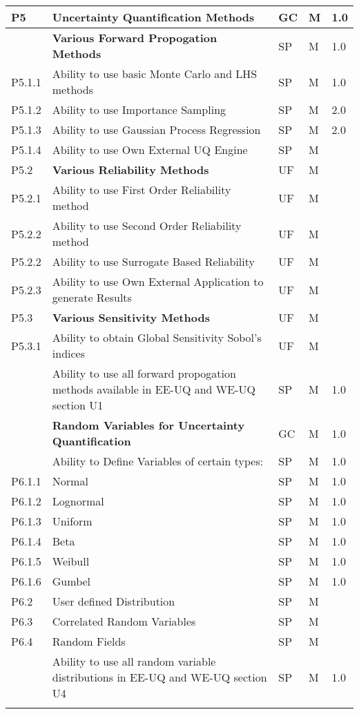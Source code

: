 \begin{longtable}{| p{} | p{} | p{} | p{} |  p{} |}
   P5 & \textbf{Uncertainty Quantification Methods} &  GC & M & 1.0  \\ \hline
   \softwareSwitch{PBE}{ 
  P5.1 & \textbf{Various Forward Propogation Methods} & SP & M & 1.0  \\ \hline
  P5.1.1 & Ability to use basic  Monte Carlo and LHS methods & SP & M & 1.0 \\ \hline
  P5.1.2 & Ability to use Importance Sampling  & SP & M & 2.0 \\ \hline
  P5.1.3 & Ability to use Gaussian Process Regression & SP & M & 2.0 \\ \hline
  P5.1.4 & Ability to use Own External UQ Engine & SP & M &  \\ \hline
  P5.2 & \textbf{Various Reliability Methods} & UF & M &  \\ \hline
  P5.2.1 & Ability to use First Order Reliability method & UF & M &  \\ \hline
  P5.2.2 & Ability to use Second Order Reliability method & UF & M & \\ \hline
  P5.2.2 & Ability to use Surrogate Based Reliability & UF & M & \\ \hline
  P5.2.3 & Ability to use Own External Application to generate Results & UF & M &  \\ \hline
  P5.3 & \textbf{Various Sensitivity Methods} & UF & M &  \\ \hline
  P5.3.1 & Ability to obtain Global Sensitivity Sobol's indices & UF & M &  \\ \hline
  } {
  P5.1 & Ability to use all forward propogation methods available in EE-UQ and WE-UQ  section U1 & SP & M & 1.0 \\ \hhline{=====}
  }
  
   P6 & \textbf{Random Variables for Uncertainty Quantification} & GC & M & 1.0  \\ \hline
   
    \softwareSwitch{PBE}{ 
   P6.1 & Ability to Define Variables of certain types: & SP & M & 1.0  \\ 
   P6.1.1 & Normal & SP & M  & 1.0 \\ \hline
    P6.1.2 & Lognormal & SP & M & 1.0 \\ \hline
    P6.1.3 & Uniform & SP & M & 1.0  \\ \hline
    P6.1.4 & Beta & SP & M & 1.0 \\ \hline
    P6.1.5 & Weibull &  SP & M  & 1.0 \\ \hline
    P6.1.6 & Gumbel &  SP & M & 1.0  \\ \hline
    P6.2 & User defined Distribution & SP & M &  \\ \hline
    P6.3 & Correlated Random Variables & SP & M &  \\ \hline
    P6.4 & Random Fields & SP & M &  \\ \hhline{=====}
    } {
    P6.1 & Ability to use all random variable distributions in EE-UQ and WE-UQ  section U4 & SP & M & 1.0 \\ \hhline{=====}
    }
    

\end{longtable}
